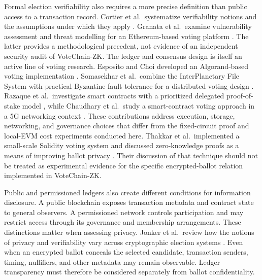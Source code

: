 Formal election verifiability also requires a more precise definition than public access to a transaction record. Cortier et al.\ systematize verifiability notions and the assumptions under which they apply \citep{cortier2016sok}. Granata et al.\ examine vulnerability assessment and threat modelling for an Ethereum-based voting platform \citep{granata2024threat}. The latter provides a methodological precedent, not evidence of an independent security audit of VoteChain-ZK. The ledger and consensus design is itself an active line of voting research. Esposito and Choi developed an Algorand-based voting implementation \citep{esposito2023algorand}. Somasekhar et al.\ combine the InterPlanetary File System with practical Byzantine fault tolerance for a distributed voting design \citep{somasekhar2024ipfs}. Razaque et al.\ investigate smart contracts with a prioritized delegated proof-of-stake model \citep{razaque2026dpos}, while Chaudhary et al.\ study a smart-contract voting approach in a 5G networking context \citep{chaudhary2023voting5g}. These contributions address execution, storage, networking, and governance choices that differ from the fixed-circuit proof and local-EVM cost experiments conducted here. Thakkar et al.\ implemented a small-scale Solidity voting system and discussed zero-knowledge proofs as a means of improving ballot privacy \citep{thakkar2021privacy}. Their discussion of that technique should not be treated as experimental evidence for the specific encrypted-ballot relation implemented in VoteChain-ZK.

Public and permissioned ledgers also create different conditions for information disclosure. A public blockchain exposes transaction metadata and contract state to general observers. A permissioned network controls participation and may restrict access through its governance and membership arrangements. These distinctions matter when assessing privacy. Jonker et al.\ review how the notions of privacy and verifiability vary across cryptographic election systems \citep{jonker2013privacy}. Even when an encrypted ballot conceals the selected candidate, transaction senders, timing, nullifiers, and other metadata may remain observable. Ledger transparency must therefore be considered separately from ballot confidentiality.

